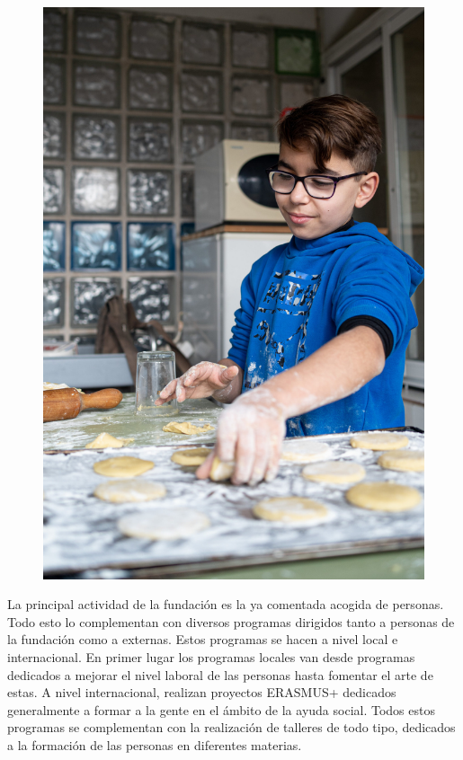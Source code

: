 \begin{figure}
    \centering
    \includegraphics[width=0.9\linewidth]{imagenes/fes/taller2.jpg}
\end{figure}

La principal actividad de la fundación es la ya comentada acogida de personas. Todo esto lo complementan con diversos programas dirigidos tanto a personas de la fundación como a externas. Estos programas se hacen a nivel local e internacional. En primer lugar los programas locales van desde programas dedicados a mejorar el nivel laboral de las personas hasta fomentar el arte de estas. A nivel internacional, realizan proyectos ERASMUS+ dedicados generalmente a formar a la gente en el ámbito de la ayuda social. Todos estos programas se complementan con la realización de talleres de todo tipo, dedicados a la formación de las personas en diferentes materias.